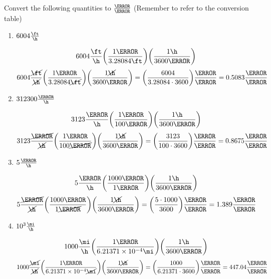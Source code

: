 \documentclass[11pt]{article} %
\begin{document}
\begin{qstn}[1] %
 Convert the following quantities to $\frac{\m}{\s}$ (Remember to refer to the conversion table)
 \begin{enumerate}
 \item $6004 \frac{\ft}{\h}$


\begin{soln}
$$6004 \frac{\ft}{\h} \left(\frac{1\m}{3.28084 \ft} \right) \left( \frac{1 \h}{3600\s} \right)$$
$$6004 \frac{\cancel{\ft}}{\cancel{\h}} \left(\frac{1\m}{3.28084 \cancel{\ft}} \right) \left( \frac{1 \cancel{\h}}{3600 \s} \right) = \left (\frac{6004}{3.28084 \cdot 3600} \right) \frac{\m}{\s} = 0.5083 \frac{\m}{\s}$$

\end{soln}


 \item $312300 \frac{\cm}{\h}$

\begin{soln}
$$3123 \frac{\cm}{\h}  \left(\frac{1\m}{100 \cm} \right) \left(\frac{1\h}{3600 \s} \right)$$
$$3123 \frac{\cancel{\cm}}{\cancel{\h}}  \left(\frac{1\m}{100 \cancel{\cm}} \right) \left(\frac{1 \cancel{\h}}{3600 \s} \right) =  \left (\frac{3123}{100 \cdot 3600} \right) \frac{\m}{\s} = 0.8675 \frac{\m}{\s}$$ 
\end{soln}


 \item $5 \frac{\km}{\h}$


\begin{soln}
$$5 \frac{\km}{\h}  \left(\frac{1000 \m}{1 \km} \right)\left(\frac{1 \h}{3600 \s} \right)$$
$$ 5 \frac{\cancel{\km}}{\cancel{\h}}  \left(\frac{1000 \m}{1 \cancel{\km}} \right)\left(\frac{1 \cancel{\h}}{3600 \s} \right) = \left(\frac{5 \cdot 1000}{3600} \right) \frac{\m}{\s} = 1.389 \frac{\m}{\s}$$


\end{soln}




 \item $10^3 \frac{\mi}{\h}$

 \begin{soln}
$$1000 \frac{\mi}{\h}  \left(\frac{1 \m}{6.21371 \times 10^{-4} \mi} \right)\left(\frac{1 \h}{3600 \s} \right)$$
$$1000 \frac{\cancel{\mi}}{\cancel{\h}} \left(\frac{1 \m}{6.21371 \times 10^{-4} \cancel{\mi}} \right)\left(\frac{1 \cancel{\h}}{3600 \s} \right) = \left(\frac{1000}{6.21371 \cdot 3600} \right) \frac{\m}{\s} = 447.04 \frac{\m}{\s}$$


\end{soln}
\end{enumerate}
\end{qstn}
\end{document}
